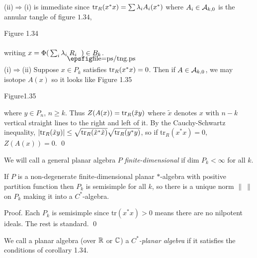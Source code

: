 (ii)$\Rightarrow$(i) is immediate since
${\bf\rm{tr}}_R(x^*x)=\sum\lambda_i A_i(x^*)$ where
$A_i\in{\cal A}_{k,0}$ is the annular tangle of figure $1.34$,
\[
        
\]
\begin{center}
        Figure 1.34
\end{center}
\ni writing $x=\Phi(\,\sum_i\lambda_i\tangle{ R_i})\in B_k$.

(i)$\Rightarrow$(ii) Suppose $x\in P_k$ satisfies
${\bf\rm{tr}}_R(x^*x)=0$. Then if $A\in{\cal A}_{k,0}$, we may isotope
$A(x)$ so it looks like Figure 1.35
\[
        
\]
\begin{center}
        Figure1.35
\end{center}
\bs\ni where $y\in P_n$, $n\geq k$. Thus
$Z(A(x))={\bf\rm{tr}}_R(\tilde x y)$ where $\tilde x$ denotes $x$ with
$n-k$ vertical straight lines to the right and left of it.
By the Cauchy-Schwartz inequality,
$|{\bf\rm{tr}}_R(\tilde x y)|\leq \sqrt{{\bf\rm{tr}}_R(\tilde x^*\tilde
x)} \sqrt{{\bf\rm{tr}}_R(y^*y)}$, so if tr${}_R(x^*x)=0$, \
$Z(A(x))=0$. \qed

\bs We will call a general planar algebra $P$ {\it
finite-dimensional} if dim $P_k < \infty$ for all $k$.

\bs
{} If $P$ is a non-degenerate
finite-dimensional  planar $*$-algebra with positive partition
function then $P_k$ is semisimple for all $k$, so there is a unique
norm $\| \ \|$ on $P_k$ making it into a $C^*$-algebra.

{\sc Proof}. Each $P_k$ is semisimple since tr$(x^*x) > 0$
means there are no nilpotent ideals. The rest is standard. 
\qed

 We call a planar algebra (over $\Bbb R$
or $\Bbb C$) a {\it $C^*$-planar algebra}
if it satisfies the conditions of corollary 1.34.


\bs\bs
{}

